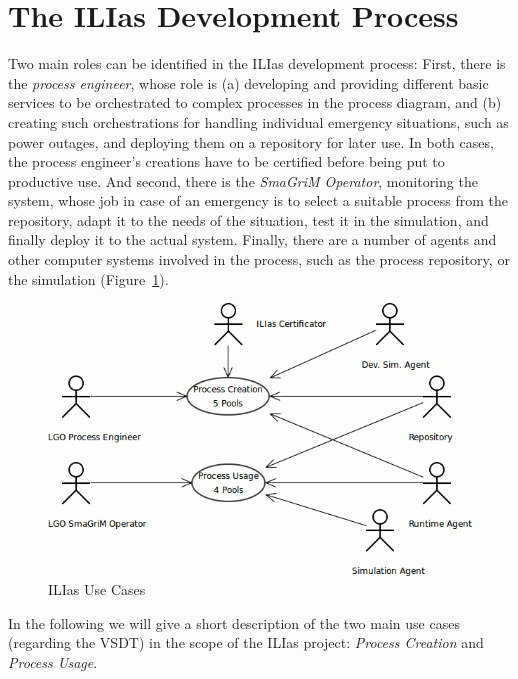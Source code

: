 
\section{The ILIas Development Process}

Two main roles can be identified in the ILIas development process:  First, there
is the \emph{process engineer}, whose role is (a) developing and providing
different basic services to be orchestrated to complex processes in the process
diagram, and (b) creating such orchestrations for handling individual emergency
situations, such as power outages, and deploying them on a repository for later
use.  In both cases, the process engineer's creations have to be certified before
being put to productive use.  And second, there is the \emph{SmaGriM Operator},
monitoring the system, whose job in case of an emergency is to select a suitable
process from the repository, adapt it to the needs of the situation, test it in
the simulation, and finally deploy it to the actual system.  Finally, there are
a number of agents and other computer systems involved in the process, such as
the process repository, or the simulation (Figure~\ref{fig:ilias-use-cases}).

\begin{figure}[ht]
	\centering
	\includegraphics[width=.5\textwidth]{ilias/bpmn_ilias-1.png}
	\caption{ILIas Use Cases}
	\label{fig:ilias-use-cases}
\end{figure}

In the following we will give a short description of the two main use cases
(regarding the VSDT) in the scope of the ILIas project: \emph{Process Creation}
and \emph{Process Usage}.


